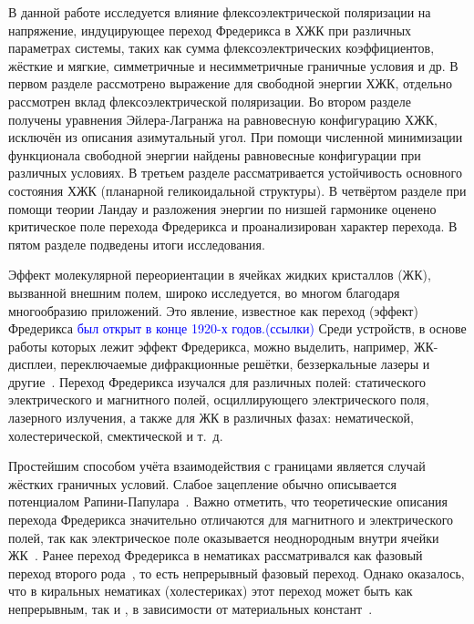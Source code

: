 В данной работе исследуется влияние флексоэлектрической поляризации на напряжение, индуцирующее переход Фредерикса в ХЖК при различных параметрах системы, таких как сумма флексоэлектрических коэффициентов, жёсткие и мягкие, симметричные и несимметричные граничные условия и др. В первом разделе рассмотрено выражение для свободной энергии ХЖК, отдельно рассмотрен вклад флексоэлектрической поляризации. Во втором разделе получены уравнения Эйлера-Лагранжа на равновесную конфигурацию ХЖК, исключён из описания азимутальный угол. При помощи численной минимизации функционала свободной энергии найдены равновесные конфигурации при различных условиях. В третьем разделе рассматривается устойчивость основного состояния ХЖК (планарной геликоидальной структуры). В четвёртом разделе при помощи теории Ландау и разложения энергии по низшей гармонике оценено критическое поле перехода Фредерикса и проанализирован характер перехода. В пятом разделе подведены итоги исследования.

Эффект молекулярной переориентации в ячейках жидких кристаллов (ЖК), вызванной внешним полем, широко исследуется, во многом благодаря многообразию приложений.
Это явление, известное как переход (эффект) Фредерикса \textcolor{blue}{был открыт в конце 1920-х годов.(ссылки)}
Среди устройств, в основе работы которых лежит эффект Фредерикса, можно выделить, например, ЖК-дисплеи, переключаемые дифракционные решётки, беззеркальные лазеры и другие~\autocite{YangWu2014}. 
Переход Фредерикса изучался для различных полей: статического электрического и магнитного полей, осциллирующего электрического поля, лазерного излучения, а также для ЖК в различных фазах: нематической, холестерической, смектической и т.~д.~\autocite{Blinov1994,deGennesbook1995,stewartBook}

Простейшим способом учёта взаимодействия с границами является случай жёстких граничных условий.
Слабое зацепление обычно описывается потенциалом Рапини-Папулара~\autocite{Rapini69}.
Важно отметить, что теоретические описания перехода Фредерикса значительно отличаются для магнитного и электрического полей, так как электрическое поле оказывается неоднородным внутри ячейки ЖК~\autocite{Deuling,NonHomoElectricField1972,CTBerr,Arakelyan1984,Napoli2006}.
Ранее переход Фредерикса в нематиках рассматривался как фазовый переход второго рода~\autocite{Guyon1975}, то есть непрерывный фазовый переход.
Однако оказалось, что в киральных нематиках (холестериках) этот переход может быть как непрерывным, так и , в зависимости от материальных констант~\autocite{VAR2013}.

